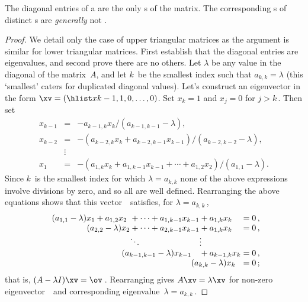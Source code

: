 \begin{theorem} \label{thm:trieig} 
The diagonal entries of a  are the only s of the matrix.  
The corresponding s of distinct s are \emph{generally} not .
\end{theorem}

\begin{proof} 
We detail only the case of upper triangular matrices as the argument is similar for lower triangular matrices. 
First establish that the diagonal entries are eigenvalues, and second prove there are no others.
Let \(\lambda\) be any value in the diagonal of the matrix~\(A\), and let \(k\)~be the smallest index such that \(a_{k,k}=\lambda\) (this `smallest' caters for duplicated diagonal values).
Let's construct an eigenvector in the form \(\xv=(\hlist x{k-1},1,0,\ldots,0)\).  
Set \(x_k=1\) and \(x_j=0\) for \(j>k\)\,.
Then set 
\begin{eqnarray*}
x_{k-1}&=&-a_{k-1,k}x_k/(a_{k-1,k-1}-\lambda),
\\x_{k-2}&=&-(a_{k-2,k}x_k+a_{k-2,k-1}x_{k-1})/(a_{k-2,k-2}-\lambda),
\\&\vdots&
\\x_1&=&-(a_{1,k}x_k+a_{1,k-1}x_{k-1}+\cdots+a_{1,2}x_2)/(a_{1,1}-\lambda).
\end{eqnarray*}
Since \(k\)~is the smallest index for which \(\lambda=a_{k,k}\) none of the above expressions involve divisions by zero, and so all are well defined.
Rearranging the above equations shows that this vector~\xv\ satisfies, for  \(\lambda=a_{k,k}\)\,,
\begin{equation*}
\begin{array}{l@{}l@{}l@{}l@{}l@{}l}
(a_{1,1}-\lambda)x_1
&{}+a_{1,2}x_2
&{}+\cdots+a_{1,k-1}x_{k-1}
&{}+a_{1,k}x_k
&{}=0\,,
\\&\hspace{-1em}
(a_{2,2}-\lambda)x_2
&{}+\cdots+a_{2,k-1}x_{k-1}
&{}+a_{1,k}x_k
&{}=0\,,
\\&&\ddots&\vdots
\\&&\hspace{-1em}
(a_{k-1,k-1}-\lambda)x_{k-1}
&{}+a_{k-1,k}x_k
&{}=0\,,
\\&&&\hspace{-1em}
(a_{k,k}-\lambda)x_k
&{}=0\,;
\end{array}
\end{equation*}
that is, \((A-\lambda I)\xv=\ov\)\,.
Rearranging gives \(A\xv=\lambda\xv\) for non-zero eigenvector~\xv\ and corresponding eigenvalue~\(\lambda=a_{k,k}\)\,.


\end{proof}
